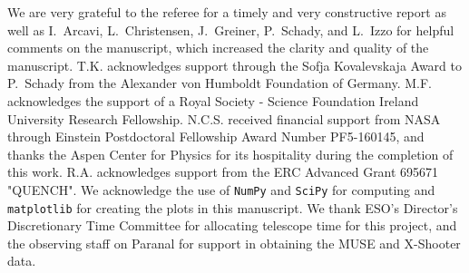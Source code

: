 \documentclass[traditabstract]{aa}
\begin{document}
\begin{acknowledgements}

We are very grateful to the referee for a timely and very constructive report as well as I.~Arcavi, L.~Christensen, J.~Greiner, P.~Schady, and L.~Izzo for helpful comments on the manuscript, which increased the clarity and quality of the manuscript. T.K. acknowledges support through the Sofja Kovalevskaja Award to P.~Schady from the Alexander von Humboldt Foundation of Germany. M.F. acknowledges the support of a Royal Society - Science Foundation Ireland University Research Fellowship. N.C.S. received financial support from NASA through Einstein Postdoctoral Fellowship Award Number PF5-160145, and thanks the Aspen Center for Physics for its hospitality during the completion of this work. R.A. acknowledges support from the ERC Advanced Grant 695671 "QUENCH". We acknowledge the use of \texttt{NumPy} and \texttt{SciPy} \citep{Walt:2011:NAS:1957373.1957466} for computing and \texttt{matplotlib} \citep{Hunter:2007} for creating the plots in this manuscript. We thank ESO's Director's Discretionary Time Committee for allocating telescope time for this project, and the observing staff on Paranal for support in obtaining the MUSE and X-Shooter data.

\end{acknowledgements}






\end{document}
